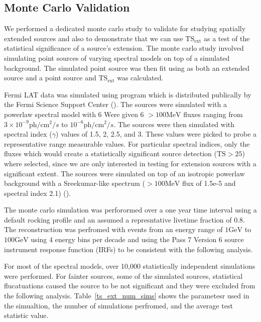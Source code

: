 \documentclass[preprint]{aastex}
\newcommand{\mev}{\text{MeV}\xspace}
\newcommand{\gev}{\text{GeV}\xspace}
\newcommand{\ph}{\text{ph}\xspace}
\newcommand{\cm}{\text{cm}\xspace}
\newcommand{\tsext}{{\ensuremath{\text{TS}_\text{ext}}}\xspace}
\newcommand{\ts}{\text{TS}\xspace}
\newcommand{\pointlike}{\text{\em pointlike}\xspace}
\newcommand{\gtobssim}{\text{\em gtobssim}\xspace}
\begin{document}
\subsection{Monte Carlo Validation} \label{monte_carlo_validation}

We performed a dedicated monte carlo study to validate \pointlike for
studying spatially extended sources and also to demonstrate that we can
use $\tsext$ as a test of the statistical significance
of a source's extension.  The monte carlo study involved simulating point
sources of varying spectral models on top of a simulated background. The
simulated point source was then fit using \pointlike as both an extended
source and a point source and $\tsext$ was calculated.

Fermi LAT data was simulated using program \gtobssim which is
distributed publically by the Fermi Science Support Center
(\cite{fssc}).  The sources were simulated with a powerlaw spectral
model with 6 Were given 6 $>100\mev$ fluxes ranging from $3\times 10^{-9}
\ph/\cm^2/s$ to $10^{-6} \ph/\cm^2/s$.  The sources were then simulated
with spectral index ($\gamma$) values of 1.5, 2, 2.5, and 3.  These
values were picked to probe a representative range measurable values.
For particular spectral indices, only the fluxes which would create a
statistically significant source detection ($\ts>25$) where selected,
since we are only interested in testing for extension sources with a
significant extent. The sources were simulated on top of an isotropic
powerlaw background with a Sreekumar-like spectrum ($>100\mev$ flux
of 1.5e-5 and spectral index 2.1) (\cite{sreekumar_isotropic}).

The monte carlo simulation was perforormed over a one year time interval using
a default rocking profile and an assumed a represntative
livetime fraction of 0.8.
The reconstruction was perfromed with events from an energy range of
$1\gev$ to $100\gev$ using 4 energy bins per decade and using the Pass 7 Version 6
source instrument response function (IRFs) to be consistent with the following analysis.

For most of the spectral models, over 10,000 statistically independent simulations were performed.
For fainter sources, some of the simulated sources, statistical flucatuations
caused the source to be not significant and they were excluded from the following analysis.
Table~\ref{ts_ext_num_sims} shows the parametesr used in the simualtion,
the number of simulations perfromed, and the average test statistic value.
\end{document}

